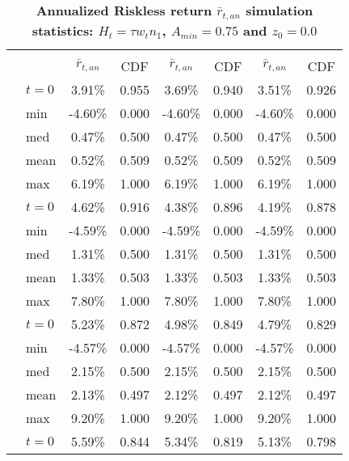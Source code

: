 \documentclass[letterpaper,12pt]{article}
\theoremstyle{definition}
\begin{document}
\begin{spacing}{1.5}
  \begin{table}[htbp]\centering\captionsetup{width=4.6in}
  \caption{\label{TabRiskl_tA75}\textbf{Annualized Riskless return $\bar{r}_{t,an}$ simulation statistics: $H_t = \tau w_t n_1$, $A_{min}=0.75$ and $z_0=0.0$}}
    \begin{threeparttable}
    \begin{tabular}{>{\small}c >{\small}l| >{\small}c >{\small}c| >{\small}c >{\small}c| >{\small}c >{\small}c}
      \hline\hline
      & & \multicolumn{2}{c}{$k_{2,0}=0.11$} & \multicolumn{2}{c}{$k_{2,0}=0.14$} & \multicolumn{2}{c}{$k_{2,0}=0.17$} \\ \cline{3-8}
      & & $\bar{r}_{t,an}$ & CDF & $\bar{r}_{t,an}$ & CDF & $\bar{r}_{t,an}$ & CDF \\
      \hline
      \multirow{5}{*}{$\tau=0.00$}
      & $t=0$ & 3.91\% & 0.955 & 3.69\% & 0.940 & 3.51\% & 0.926 \\
      & min & -4.60\% & 0.000 & -4.60\% & 0.000 & -4.60\% & 0.000 \\
      & med & 0.47\% & 0.500 & 0.47\% & 0.500 & 0.47\% & 0.500 \\
      & mean & 0.52\% & 0.509 & 0.52\% & 0.509 & 0.52\% & 0.509 \\
      & max & 6.19\% & 1.000 & 6.19\% & 1.000 & 6.19\% & 1.000 \\
      \hline
      \multirow{5}{*}{$\tau=0.11$}
      & $t=0$ & 4.62\% & 0.916 & 4.38\% & 0.896 & 4.19\% & 0.878 \\
      & min & -4.59\% & 0.000 & -4.59\% & 0.000 & -4.59\% & 0.000 \\
      & med & 1.31\% & 0.500 & 1.31\% & 0.500 & 1.31\% & 0.500 \\
      & mean & 1.33\% & 0.503 & 1.33\% & 0.503 & 1.33\% & 0.503 \\
      & max & 7.80\% & 1.000 & 7.80\% & 1.000 & 7.80\% & 1.000 \\
      \hline
      \multirow{5}{*}{$\tau=0.20$}
      & $t=0$ & 5.23\% & 0.872 & 4.98\% & 0.849 & 4.79\% & 0.829 \\
      & min & -4.57\% & 0.000 & -4.57\% & 0.000 & -4.57\% & 0.000 \\
      & med & 2.15\% & 0.500 & 2.15\% & 0.500 & 2.15\% & 0.500 \\
      & mean & 2.13\% & 0.497 & 2.12\% & 0.497 & 2.12\% & 0.497 \\
      & max & 9.20\% & 1.000 & 9.20\% & 1.000 & 9.20\% & 1.000 \\
      \hline
      \multirow{5}{*}{$\tau=0.25$}
      & $t=0$ & 5.59\% & 0.844 & 5.34\% & 0.819 & 5.13\% & 0.798 \\

\end{tabular}
\end{threeparttable}
\end{table}
\end{spacing}
\end{document}
